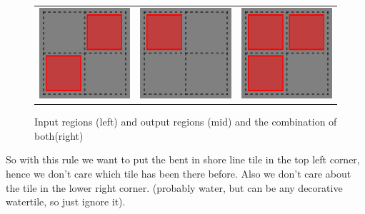 \begin{figure}
  \begin{center}
       \begin{tabular}{c c c}
		\includegraphics[scale=1]{Example/TheManaWorld/shorelinecorners/regions_input.eps} & 
		\includegraphics[scale=1]{Example/TheManaWorld/shorelinecorners/regions_output.eps} & 
		\includegraphics[scale=1]{Example/TheManaWorld/shorelinecorners/regions_united.eps} \\
		\end{tabular}
  \end{center}
  \caption{Input regions (left) and output regions (mid) and the combination of both(right)}
  \label{shoreline_corners_regions}
\end{figure}
So with this rule we want to put the bent in shore line tile in the top
left corner, hence we don't care which tile has been there before.
Also we don't care about the tile in the lower right corner. (probably water,
but can be any decorative watertile, so just ignore it).

